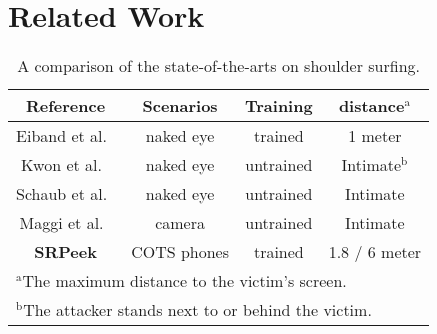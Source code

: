 \section{Related Work}
\label{sec-related-work}
\begin{table}[t]
  \caption{A comparison of the state-of-the-arts on shoulder surfing.}
  \vspace{2mm}
  \begin{center}
  \begin{tabular}{cccc}
  \hline
   Reference & Scenarios & Training & distance$^{\mathrm{a}}$ \\
  \hline
  Eiband et al.~\cite{eiband2017understanding}  & naked eye & trained & 1 meter \\
  Kwon et al.~\cite{kwon2013covert}  & naked eye & untrained  & Intimate$^{\mathrm{b}}$\\
Schaub et al.~\cite{schaub2012password} & naked eye & untrained & Intimate\\
  Maggi et al.~\cite{maggi2011poster}  & camera & untrained  & Intimate \\
  \hline
  \hline
  \textbf{\textsf{SRPeek}} & COTS phones & trained  & 1.8 / 6 meter\\
  \hline
  \multicolumn{4}{l}{$^{\mathrm{a}}$The maximum distance to the victim's screen.}\\

  \multicolumn{4}{l}{$^{\mathrm{b}}$The attacker stands next to or behind the victim.}\\
  \end{tabular}
  \label{tbl:comparison}
  \end{center}
\end{table}

